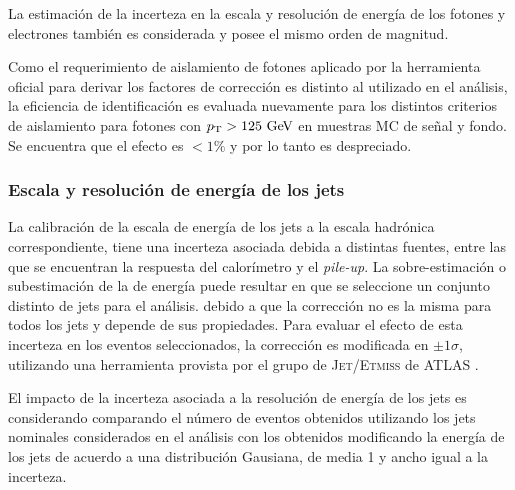 La estimación de la incerteza en la escala y resolución de energía de los fotones y
electrones \cite{EGScaleTwiki} también es considerada y posee el mismo orden de magnitud.

Como el requerimiento de aislamiento de fotones aplicado por la herramienta oficial para derivar los factores de corrección
es distinto al utilizado en el análisis, la eficiencia de identificación es evaluada nuevamente
para los distintos criterios de aislamiento para fotones con $\pt>125\gev$ en muestras MC
de señal y fondo. Se encuentra que el efecto es $<1\%$ y por lo tanto es despreciado.




\subsubsection{Escala y resolución de energía de los jets}




La calibración de la escala de energía de los jets a la escala hadrónica correspondiente,
tiene una incerteza asociada debida a distintas fuentes, entre las que se encuentran
la respuesta del calorímetro y el \emph{pile-up}.
La sobre-estimación o subestimación de la de energía puede resultar
en que se seleccione un conjunto distinto de jets para el análisis. debido a que la corrección
no es la misma para todos los jets y depende de sus propiedades. Para evaluar el efecto
de esta incerteza en los eventos seleccionados, la corrección es modificada
en $\pm 1\sigma$, utilizando una herramienta provista por el grupo de \textsc{Jet/Etmiss}
de ATLAS \cite{JesTwiki}.

El impacto de la incerteza asociada a la resolución de energía
de los jets es considerando comparando el número de eventos obtenidos
utilizando los jets nominales considerados en el análisis con los obtenidos modificando
la energía de los jets de acuerdo a una distribución Gausiana, de media 1 y ancho igual
a la incerteza.


